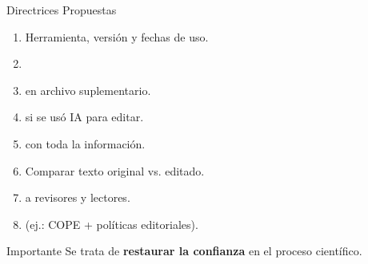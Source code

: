 \begin{frame}{Directrices Propuestas}
    \begin{enumerate}
        \item {} Herramienta, versión y fechas de uso.
        \item {}
        \item {} en archivo suplementario.
        \item {} si se usó IA para editar.
        \item {} con toda la información.
        \item {} Comparar texto original vs. editado.
        \item {} a revisores y lectores.
        \item {} (ej.: COPE + políticas editoriales).
    \end{enumerate}
    \begin{boxC}{Importante}
        Se trata de \textbf{restaurar la confianza} en el proceso científico.
    \end{boxC}
\end{frame}

